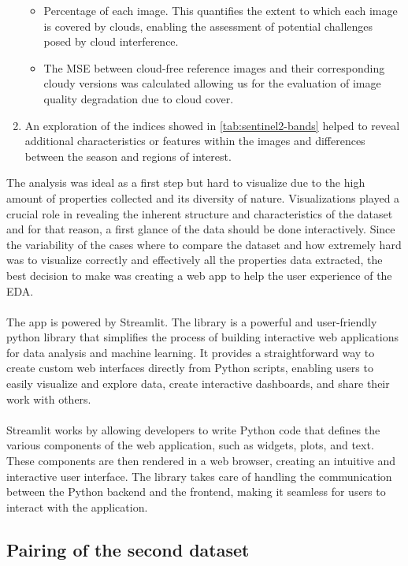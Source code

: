 \documentclass[11pt, a4paper]{article}
\begin{document}
\begin{enumerate}
		\begin{itemize}
			\item Percentage of each image. This quantifies the extent to which each image is covered by clouds, enabling the assessment of potential challenges posed by cloud interference.
			\item The MSE between cloud-free reference images and their corresponding cloudy versions was calculated allowing us for the evaluation of image quality degradation due to cloud cover.
		\end{itemize}
		\item An exploration of the indices showed in \ref{tab:sentinel2-bands} helped to reveal additional characteristics or features within the images and differences between the season and regions of interest.
	\end{enumerate}
	The analysis was ideal as a first step but hard to visualize due to the high amount of properties collected and its diversity of nature. Visualizations played a crucial role in revealing the inherent structure and characteristics of the dataset and for that reason, a first glance of the data should be done interactively. 
	Since the variability of the cases where to compare the dataset and how extremely hard was to visualize correctly and effectively all the properties data extracted, the best decision to make was creating a web app to help the user experience of the EDA. 
	\\
	\\
	The app is powered by Streamlit. The library is a powerful and user-friendly python library that simplifies the process of building interactive web applications for data analysis and machine learning. It provides a straightforward way to create custom web interfaces directly from Python scripts, enabling users to easily visualize and explore data, create interactive dashboards, and share their work with others.
	\\\\
	Streamlit works by allowing developers to write Python code that defines the various components of the web application, such as widgets, plots, and text. These components are then rendered in a web browser, creating an intuitive and interactive user interface. The library takes care of handling the communication between the Python backend and the frontend, making it seamless for users to interact with the application.
	\subsection{Pairing of the second dataset}
\end{document}
